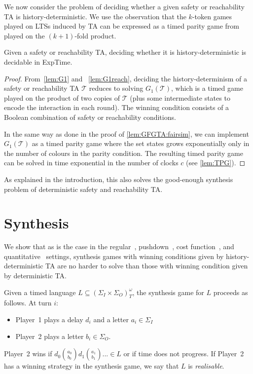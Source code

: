 \documentclass[10pt,a4paper]{amsart}
\theoremstyle{definition}
\numberwithin{equation}{section}
\newcommand{\T}{\mathcal{T}}
\newcommand{\exptime}{\EXPTIME}
\newcommand{\EXPTIME}{{\sc ExpTime}}
\begin{document}
We now consider the problem of deciding whether a given safety or reachability TA
is history-deterministic. We use the observation that
the $k$-token games played on LTSs induced by TA can be expressed as a timed parity game from~\cite{CHP08} played on the $(k+1)$-fold product.



\begin{theorem}\label{thm:decidable}
Given a safety or reachability TA, deciding whether it is history-deterministic is decidable in \exptime.
\end{theorem}

\begin{proof}
From~\cref{lem:G1} and ~\cref{lem:G1reach}, deciding the history-determinism of a safety or reachability TA $\T$ reduces to solving $G_1(\T)$, which is a timed game played on the product of two copies of $\T$ (plus some intermediate states to encode the interaction in each round). The winning condition consists of a Boolean combination of safety or reachability conditions.

In the same way as done in the proof of \cref{lem:GFGTA:fairsim}, we can implement $G_1(\T)$ as a timed parity
game where the set states grows exponentially only in the number of colours in the parity condition.
The resulting timed parity game can be solved in time exponential in the number of clocks $c$ (see
\cref{lem:TPG}).
\end{proof}

As explained in the introduction, this also solves the good-enough synthesis problem of deterministic safety and reachability TA.

	
	
	\section{Synthesis}
	\label{sec_synthesis}
	\label{sec:synthesis}
We show that as is the case in the regular~\cite{HP06}, pushdown~\cite{LZ22}, cost function~\cite{Col09}, and quantitative~\cite{BL21} settings, synthesis games with winning conditions given by history-deterministic TA are no harder to solve than those with winning condition given by deterministic TA.


\begin{definition}
	Given a timed language $L\subseteq (\Sigma_I\times \Sigma_O)^\omega_T$, the synthesis game for $L$ proceeds as follows.
	At turn $i$:
	\begin{itemize}
		\item Player~1 plays a delay $d_i$ and a letter $a_i\in \Sigma_I$
		\item Player~2 plays a letter $b_i\in \Sigma_O$.
	\end{itemize}
	Player~2 wins if $d_0\binom{a_0}{b_0}d_1\binom{a_1}{b_1}...\in L$ or if time does not progress.
If Player~2 has a winning strategy in the synthesis game, we say that $L$ is \emph{realisable}.
\end{definition}
\end{document}
